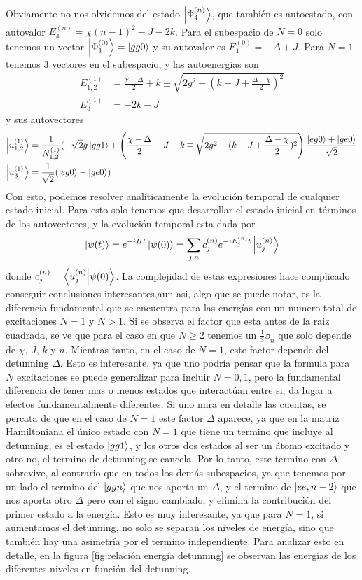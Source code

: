 Obviamente no nos olvidemos del estado $\ket{\Phi_4^{(n)}}$, que tambi\'en es autoestado, con autovalor $E_4^{(n)}=\chi(n-1)^2-J-2k$.
Para el subespacio de $N=0$ solo tenemos un vector $\ket{\Phi_1^{(0)}}=\ket{gg0}$ y su autovalor es $E_1^{(0)}=-\Delta+J$.
Para $N=1$ tenemos 3 vectores en el subespacio, y las autoenergías son
\begin{align}\label{ec4:energias n1}
    E_{1,2}^{(1)} &=\frac{\chi -\Delta}{2} +k \pm \sqrt{2g^2+(k-J+\frac{\Delta -\chi}{2} )^2}\\
    E_3^{(1)} & = -2k-J      
\end{align}
y sus autovectores
\begin{align}
    \ket{u_{1,2}^{(1)}}&=\frac{1}{N_{1,2}^{(1)}}(-\sqrt{2}g\ket{gg1}+ \left(\frac{\chi-\Delta}{2}+J-k \mp \sqrt{2g^2+(k-J+\frac{\Delta -\chi}{2} )^2} \right)\dfrac{\ket{eg0}+\ket{ge0}}{\sqrt{2}}\\
    \ket{u_3^{(1)}}&= \frac{1}{\sqrt{2}}(\ket{eg0}-\ket{ge0})
\end{align}
Con esto, podemos resolver analíticamente la evolución temporal de cualquier estado inicial.
Para esto solo tenemos que desarrollar el estado inicial en términos de los autovectores, y la evolución temporal esta dada por
\begin{equation}
\ket{\psi(t)}=e^{-iHt}\ket{\psi(0)}=\sum_{j,n} c_j^{(n)}e^{-iE_j^{(n)}t}\ket{u_j^{(n)}}
\end{equation}
donde $c_j^{(n)}=\braket{u_j^{(n)}}{\psi(0)}$.
La complejidad de estas expresiones hace complicado conseguir conclusiones interesantes,aun asi, algo que se puede notar, es la diferencia fundamental que se encuentra para las energías con un numero total de excitaciones $N=1$ y $N>1$. Si se observa el factor que esta antes de la raiz cuadrada,  se ve que para el caso en que $N \geq 2$ tenemos un $\frac{1}{3}\beta_n$ que solo depende de $\chi$, $J$, $k$ y $n$. Mientras tanto, en el caso de $N=1$, este factor depende del detunning $\Delta$. Esto es interesante, ya que uno podría pensar que la formula para $N$ excitaciones se puede generalizar para incluir $N=0,1$, pero la fundamental diferencia de tener mas o menos estados que interactúan entre si, da lugar a efectos fundamentalmente diferentes. Si uno mira en detalle las cuentas, se percata de que en el caso de $N=1$ este factor $\Delta$ aparece, ya que en la matriz Hamiltoniana el único estado con $N=1$ que tiene un termino que incluye al detunning, es el estado $\ket{gg1}$, y los otros dos estados al ser un átomo excitado y otro no, el termino de detunning se cancela. Por lo tanto, este termino con $\Delta$ sobrevive, al contrario que en todos los demás subespacios, ya que tenemos por un lado el termino del $\ket{ggn}$ que nos aporta un $\Delta$, y el termino de $\ket{ee,n-2}$ que nos aporta otro $\Delta$ pero con el signo cambiado, y elimina la contribución del primer estado a la energía. Esto es muy interesante, ya que para $N=1$, si aumentamos el detunning, no solo se separan los niveles de energía, sino que también hay una asimetría por el termino independiente. Para analizar esto en detalle, en la figura \ref{fig:relación energia detunning} se observan las energías de los diferentes niveles en función del detunning. 

